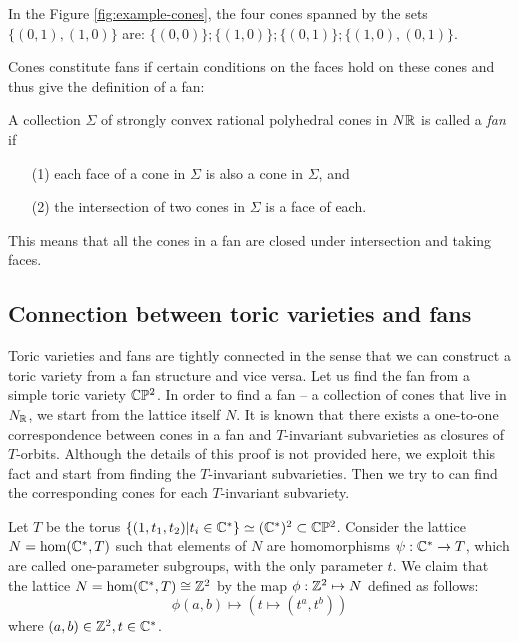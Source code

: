     In the Figure \ref{fig:example-cones}, the four cones spanned by the sets $\{(0, 1), (1, 0)\}$ are: $\{(0, 0)\}; \{(1, 0)\}; \{(0, 1)\}; \{(1, 0), (0, 1)\}$. 

    Cones constitute fans if certain conditions on the faces hold on these cones and thus give the definition of a fan:
    \begin{definition}
        A collection $\Sigma$ of strongly convex rational polyhedral cones in $N \mathbb{R}$ is called a \emph{fan} if 
	    \begin{enumerate}
		\item[(1)] each face of a cone in $\Sigma$ is also a cone in $\Sigma$, and 
		\item[(2)] the intersection of two cones in $\Sigma$ is a face of each. 
    	\end{enumerate}
    \end{definition}
    This means that all the cones in a fan are closed under intersection and taking faces. 

\subsection{Connection between toric varieties and fans}
\label{subsec:toric-variety-fan}
    Toric varieties and fans are tightly connected in the sense
    that we can construct a toric variety from a fan structure and vice versa. 
    Let us find the fan from a simple toric variety $\mathbb{C}\mathbb{P}^2$.
    In order to find a fan -- a collection of cones that live in $N_{\mathbb{R}}$, we start from the lattice itself $N$.
    It is known that there exists a one-to-one correspondence between cones in a fan and $T$-invariant subvarieties 
    as closures of $T$-orbits. 
    Although the details of this proof is not provided here, 
    we exploit this fact and start from finding the $T$-invariant subvarieties.
    Then we try to can find the corresponding cones for each $T$-invariant subvariety.

    Let $T$ be the torus $\{(1, t_1, t_2) | t_i \in \mathbb{C}^\ast\} \simeq (\mathbb{C}^\ast)^2 \subset \mathbb{C}\mathbb{P}^2$.
    Consider the lattice $N = \hom(\mathbb{C}^\ast, T)$ 
    such that elements of $N$ are homomorphisms $\psi: \mathbb{C}^\ast \rightarrow T$,
    which are called one-parameter subgroups, with the only parameter $t$. 
    We claim that the lattice $N = \hom(\mathbb{C}^\ast, T) \cong \mathbb{Z}^2$ 
    by the map $\phi: \mathbb{Z}^2 \mapsto N$ defined as follows:
    \[
    \phi(a, b) \mapsto (t \mapsto (t^a, t^b))
    \] 
    where $(a, b) \in \mathbb{Z}^2, t \in \mathbb{C}^\ast$.


